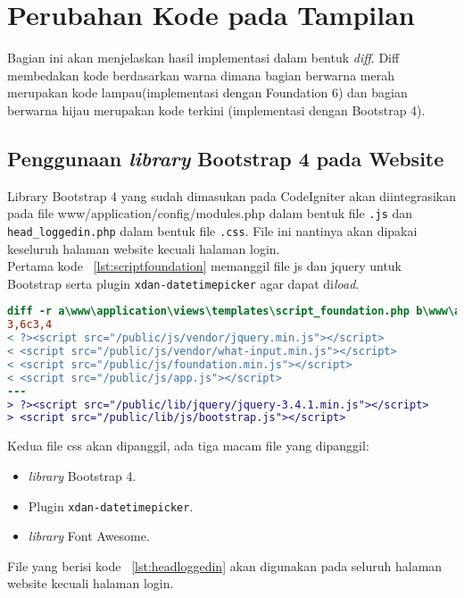 \section{Perubahan Kode pada Tampilan}

Bagian ini akan menjelaskan hasil implementasi dalam bentuk \textit{diff}. Diff membedakan kode berdasarkan warna dimana bagian berwarna merah merupakan kode lampau(implementasi dengan Foundation 6) dan bagian berwarna hijau merupakan kode terkini  (implementasi dengan Bootstrap 4).

\subsection{Penggunaan \textit{library} Bootstrap 4 pada Website}

Library Bootstrap 4 yang sudah dimasukan pada CodeIgniter akan diintegrasikan pada file www/application/config/modules.php dalam bentuk file \texttt{.js} dan \texttt{head\_loggedin.php} dalam bentuk file \texttt{.css}. File ini nantinya akan dipakai keseluruh halaman website kecuali halaman login.\\

Pertama kode ~\ref{lst:scriptfoundation} memanggil file js dan jquery untuk Bootstrap serta plugin \texttt{xdan-datetimepicker} agar dapat di\textit{load}. \\

\begin{lstlisting}[language=diff, caption=Penambahan \path{\views\templates\script_foundation.php},  basicstyle=\ttfamily, frame=single,
columns=fullflexible, keepspaces=true, breaklines=true, label={lst:scriptfoundation}]
diff -r a\www\application\views\templates\script_foundation.php b\www\application\views\templates\script_foundation.php
3,6c3,4
< ?><script src="/public/js/vendor/jquery.min.js"></script>
< <script src="/public/js/vendor/what-input.min.js"></script>
< <script src="/public/js/foundation.min.js"></script>
< <script src="/public/js/app.js"></script>
---
> ?><script src="/public/lib/jquery/jquery-3.4.1.min.js"></script>
> <script src="/public/lib/js/bootstrap.js"></script>

\end{lstlisting}

Kedua file css akan dipanggil, ada tiga macam file yang dipanggil: 
\begin{itemize}
	\item \textit{library} Bootstrap 4.
	\item Plugin \texttt{xdan-datetimepicker}.
	\item \textit{library} Font Awesome.
\end{itemize}
File yang berisi kode ~\ref{lst:headloggedin} akan digunakan pada seluruh halaman website kecuali halaman login.

